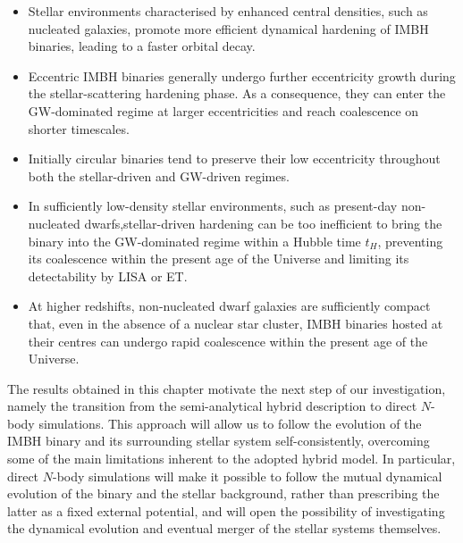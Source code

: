 \documentclass[12pt,twoside,openany]{book}
\begin{document}
\begin{itemize}
\item Stellar environments characterised by enhanced central densities, such as  nucleated galaxies, promote more efficient dynamical hardening of IMBH binaries, leading to a faster orbital decay.

\item Eccentric IMBH binaries generally undergo further eccentricity growth during the stellar-scattering hardening phase. As a consequence, they can enter the GW-dominated regime at larger eccentricities and reach coalescence on shorter timescales.

\item Initially circular binaries tend to preserve their low eccentricity throughout both the stellar-driven and GW-driven regimes.

\item In sufficiently low-density stellar environments, such as present-day non-nucleated dwarfs,stellar-driven hardening can be too inefficient to bring the binary into the GW-dominated regime within a Hubble time $t_H$, preventing its coalescence within the present age of the Universe and limiting its detectability by LISA or ET.

\item At higher redshifts, non-nucleated dwarf galaxies are sufficiently compact that, even in the absence of a nuclear star cluster, IMBH binaries hosted at their centres can undergo rapid coalescence within the present age of the Universe.
\end{itemize}
The results obtained in this chapter motivate the next step of our investigation, namely the transition from the semi-analytical hybrid description to direct $N$-body simulations. This approach will allow us to follow the evolution of the IMBH binary and its surrounding stellar system self-consistently, overcoming some of the main limitations inherent to the adopted hybrid model. In particular, direct $N$-body simulations will make it possible to follow the mutual dynamical evolution of the binary and the stellar background, rather than prescribing the latter as a fixed external potential, and will open the possibility of investigating the dynamical evolution and eventual merger of the stellar systems themselves.
\end{document}
